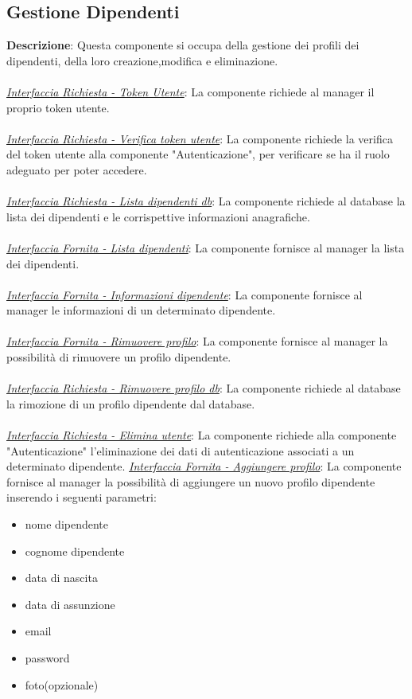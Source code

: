\documentclass{report}
\begin{document}
\subsection*{Gestione Dipendenti}
\textbf{Descrizione}: Questa componente si occupa della gestione dei profili dei dipendenti, della loro creazione,modifica e eliminazione.\\\\
\uline{\textit{Interfaccia Richiesta - Token Utente}}:
La componente richiede al manager il proprio token utente. \\ \\
\uline{\textit{Interfaccia Richiesta - Verifica token utente}}: 
La componente richiede la verifica del token utente alla componente "Autenticazione", per verificare se ha il ruolo adeguato per poter accedere. \\ \\ 
\uline{\textit{Interfaccia Richiesta - Lista dipendenti db}}:
La componente richiede al database la lista dei dipendenti e le corrispettive informazioni anagrafiche.\\\\
\uline{\textit{Interfaccia Fornita - Lista dipendenti}}:
La componente fornisce al manager la lista dei dipendenti.\\\\
\uline{\textit{Interfaccia Fornita - Informazioni dipendente}}:
La componente fornisce al manager le informazioni di un determinato dipendente.\\\\
\uline{\textit{Interfaccia Fornita - Rimuovere profilo}}:
La componente fornisce al manager la possibilità di rimuovere un profilo dipendente.\\\\
\uline{\textit{Interfaccia Richiesta - Rimuovere profilo db}}:
La componente richiede al database la rimozione di un profilo dipendente dal database.\\\\
\uline{\textit{Interfaccia Richiesta - Elimina utente}}:
La componente richiede alla componente "Autenticazione" l'eliminazione dei dati di autenticazione associati a un determinato dipendente. 
\uline{\textit{Interfaccia Fornita - Aggiungere profilo}}:
La componente fornisce al manager la possibilità di aggiungere un nuovo profilo dipendente inserendo i seguenti parametri:
\begin{itemize}
	\item nome dipendente
	\item cognome dipendente
	\item data di nascita
	\item data di assunzione
	\item email 
	\item password
	\item foto(opzionale)
\end{itemize}
\end{document}
